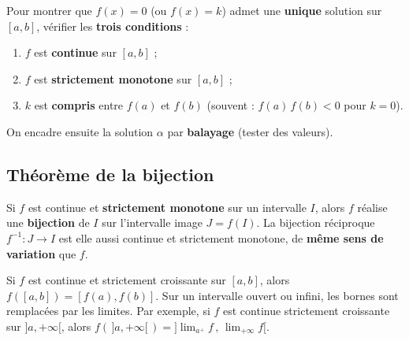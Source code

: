 \begin{aretenir}
Pour montrer que $f(x)=0$ (ou $f(x)=k$) admet une \textbf{unique} solution sur $[a,b]$, vérifier les \textbf{trois conditions} :
\begin{enumerate}[label=(\arabic*)]
\item $f$ est \textbf{continue} sur $[a,b]$ ;
\item $f$ est \textbf{strictement monotone} sur $[a,b]$ ;
\item $k$ est \textbf{compris} entre $f(a)$ et $f(b)$ (souvent : $f(a)\,f(b)<0$ pour $k=0$).
\end{enumerate}
On encadre ensuite la solution $\alpha$ par \textbf{balayage} (tester des valeurs).
\end{aretenir}

\subsection{Théorème de la bijection}

\begin{theoreme}
Si $f$ est continue et \textbf{strictement monotone} sur un intervalle $I$, alors $f$ réalise une \textbf{bijection} de $I$ sur l'intervalle image $J=f(I)$. La bijection réciproque $f^{-1}:J\to I$ est elle aussi continue et strictement monotone, de \textbf{même sens de variation} que $f$.
\end{theoreme}

\begin{propriete}
Si $f$ est continue et strictement croissante sur $[a,b]$, alors $f([a,b])=[f(a),f(b)]$. Sur un intervalle ouvert ou infini, les bornes sont remplacées par les limites. Par exemple, si $f$ est continue strictement croissante sur $]a,+\infty[$, alors $f(\,]a,+\infty[\,)=\big]\lim_{a^{+}}f\,,\,\lim_{+\infty}f\big[$.
\end{propriete}

\begin{illus}
\end{illus}

